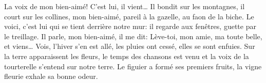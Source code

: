 La voix de mon bien-aimé! C’est lui, il vient… Il bondit sur les montagnes, il court sur les collines,
mon bien-aimé, pareil à la gazelle, au faon de la biche. Le voici, c’est lui qui se tient derrière notre mur: il regarde aux fenêtres, guette par le treillage.
Il parle, mon bien-aimé, il me dit: Lève-toi, mon amie, ma toute belle, et viens…
Vois, l’hiver s’en est allé, les pluies ont cessé, elles se sont enfuies.
Sur la terre apparaissent les fleurs, le temps des chansons est venu et la voix de la tourterelle s’entend sur notre terre.
Le figuier a formé ses premiers fruits, la vigne fleurie exhale sa bonne odeur.
